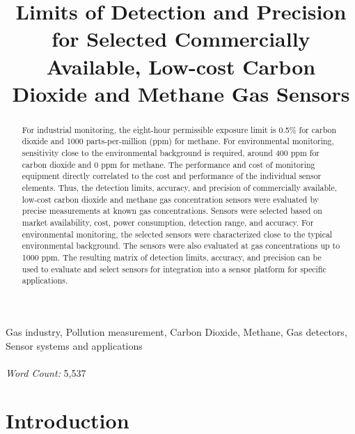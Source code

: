 \documentclass[times]{joehreview}
\begin{document}
	
	\begin{frontmatter}
		\title{Limits of Detection and Precision for Selected Commercially Available, Low-cost Carbon Dioxide and Methane Gas Sensors}
		\begin{abstract} 
			
			For industrial monitoring, the eight-hour permissible exposure limit is 0.5\% for carbon dioxide and 1000 parts-per-million (ppm) for methane.  For environmental monitoring, sensitivity close to the environmental background is required, around 400 ppm for carbon dioxide and 0 ppm for methane.  The performance and cost of monitoring equipment directly correlated to the cost and performance of the individual sensor elements.  Thus, the detection limits, accuracy, and precision of commercially available, low-cost carbon dioxide and methane gas concentration sensors were evaluated by precise measurements at known gas concentrations.  Sensors were selected based on market availability, cost, power consumption, detection range, and accuracy.  For environmental monitoring, the selected sensors were characterized close to the typical environmental background.  The sensors were also evaluated at gas concentrations up to 1000 ppm.  The resulting matrix of detection limits, accuracy, and precision can be used to evaluate and select sensors for integration into a sensor platform for specific applications.  
			
		\end{abstract}
		
		\begin{keyword}
			Gas industry, Pollution measurement, Carbon Dioxide, Methane, Gas detectors, Sensor systems and applications
			\\~\\
			\textit{Word Count:} 5,537
		\end{keyword}
		
	\end{frontmatter}
	
	\newpage
	
	\section{Introduction}
	\label{sec:intro}
	
\end{document}

